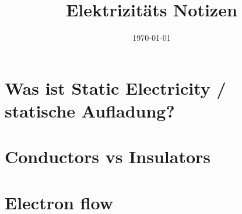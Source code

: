 \documentclass[a4paper, 12pt]{scrartcl}
\title{Elektrizitäts Notizen}
\date{\today}
\begin{document}
    \maketitle
    \tableofcontents
    \section {Was ist Static Electricity / statische Aufladung?}
    
    \section{Conductors vs Insulators}
    
    \section{Electron flow}
    
    
\end{document}

